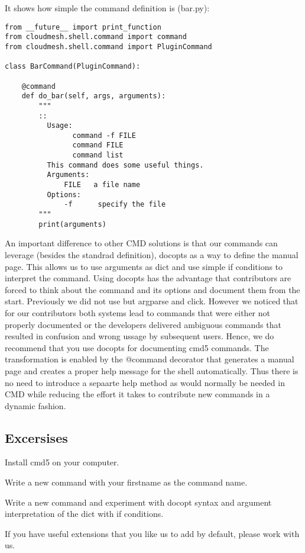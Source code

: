It shows how simple the command definition is (bar.py):

\begin{verbatim}
from __future__ import print_function
from cloudmesh.shell.command import command
from cloudmesh.shell.command import PluginCommand

class BarCommand(PluginCommand):

    @command
    def do_bar(self, args, arguments):
        """
        ::
          Usage:
                command -f FILE
                command FILE
                command list
          This command does some useful things.
          Arguments:
              FILE   a file name
          Options:
              -f      specify the file
        """
        print(arguments)
\end{verbatim}

An important difference to other CMD solutions is that our commands can
leverage (besides the standrad definition), docopts as a way to define
the manual page. This allows us to use arguments as dict and use simple
if conditions to interpret the command. Using docopts has the advantage
that contributors are forced to think about the command and its options
and document them from the start. Previously we did not use but argparse
and click. However we noticed that for our contributors both systems
lead to commands that were either not properly documented or the
developers delivered ambiguous commands that resulted in confusion and
wrong ussage by subsequent users. Hence, we do recommend that you use
docopts for documenting cmd5 commands. The transformation is enabled by
the @command decorator that generates a manual page and creates a proper
help message for the shell automatically. Thus there is no need to
introduce a sepaarte help method as would normally be needed in CMD
while reducing the effort it takes to contribute new commands in a
dynamic fashion.

\subsection{Excersises}

\begin{exercise}
\label{E:CMD5.1:}
Install cmd5 on your computer.
\end{exercise}

\begin{exercise}
\label{E:CMD5.2:}
Write a new command with your firstname as the command name.
\end{exercise}

\begin{exercise}
\label{E:CMD5.3:}
Write a new command and experiment with docopt syntax and argument
interpretation of the dict with if conditions.
\end{exercise}

\begin{exercise}
\label{E:CMD5.4:}
If you have useful extensions that you like us to add by default, please
work with us.
\end{exercise}
